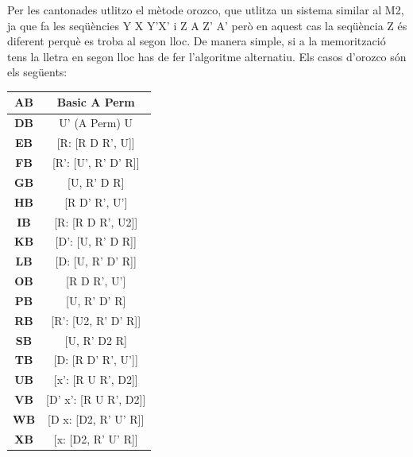 Per les cantonades utlitzo el mètode orozco, que utlitza un sistema similar al M2, ja que fa les seqüències Y X Y'X' i Z A Z' A' però en aquest cas la seqüència Z és diferent perquè es troba al segon lloc. De manera simple, si a la memorització tens la lletra en segon lloc has de fer l'algoritme alternatiu.
Els casos d'orozco són els següents:

\begin{table}[h]
    \begin{minipage}{.5\linewidth}
        \centering
        \begin{tabular}{|c|c|} 
            \hline
            \textbf{AB} & Basic A Perm \\
            \hline
            \textbf{DB} & U' (A Perm) U \\
            \hline
            \textbf{EB} & [R: [R D R', U]] \\
            \hline
            \textbf{FB} & [R': [U', R' D' R]] \\
            \hline
            \textbf{GB} & [U, R' D R] \\
            \hline
            \textbf{HB} & [R D' R', U'] \\
            \hline
            \textbf{IB} & [R: [R D R', U2]] \\
            \hline
            \textbf{KB} & [D': [U, R' D R]] \\
            \hline
            \textbf{LB} & [D: [U, R' D' R]] \\
            \hline
            \textbf{OB} & [R D R', U'] \\
            \hline
            \textbf{PB} & [U, R' D' R] \\
            \hline
            \textbf{RB} & [R': [U2, R' D' R]] \\
            \hline
            \textbf{SB} & [U, R' D2 R] \\
            \hline
            \textbf{TB} & [D: [R D' R', U']] \\
            \hline
            \textbf{UB} & [x': [R U R', D2]] \\
            \hline
            \textbf{VB} & [D' x': [R U R', D2]] \\
            \hline
            \textbf{WB} & [D x: [D2, R' U' R]] \\
            \hline
            \textbf{XB} & [x: [D2, R' U' R]] \\
            \hline 
        \end{tabular}
    \end{minipage}

\end{table}

